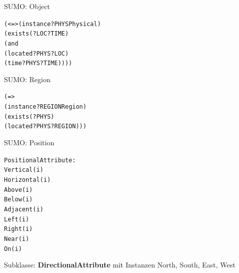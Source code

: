 \documentclass[12pt,a4paper]{beamer}
\begin{document}
\begin{frame}{SUMO: Object}
\begin{alltt}

(<=> (instance ?PHYS Physical)\\
    (exists (?LOC ?TIME)\\
    (and\\
    (located ?PHYS ?LOC)\\
    (time ?PHYS ?TIME))))\\

\end{alltt}

\end{frame}




\begin{frame}{SUMO: Region}
\begin{alltt}
(=>
    (instance ?REGION Region)\\
    (exists (?PHYS)\\
    (located ?PHYS ?REGION)))\\
\end{alltt}
\end{frame}




\begin{frame}{SUMO: Position}
\begin{alltt}
PositionalAttribute:\\
    Vertical(i)\\
    Horizontal(i)\\
    Above(i)\\
    Below(i)\\
    Adjacent(i)\\
    Left(i)\\
    Right(i)\\
    Near(i)\\
    On(i)\\
\end{alltt}
Subklasse: \textbf{DirectionalAttribute} mit Instanzen North, South, East, West
\end{frame}
\end{document}
